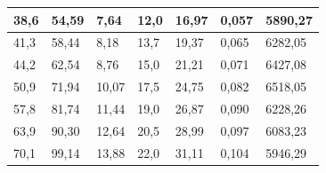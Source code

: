 \documentclass[a4paper,12pt]{article} %
\begin{document}
\begin{table}[h!]
\begin{tabular}{|l|l|l|l|l|l|l|}
		38,6                                      & 54,59                                                   & 7,64                                                  & 12,0                                     & 16,97                                                   & 0,057                        & 5890,27                                         \\ \hline
		41,3                                      & 58,44                                                   & 8,18                                                  & 13,7                                     & 19,37                                                   & 0,065                        & 6282,05                                         \\ \hline
		44,2                                      & 62,54                                                   & 8,76                                                  & 15,0                                     & 21,21                                                   & 0,071                        & 6427,08                                         \\ \hline
		50,9                                      & 71,94                                                   & 10,07                                                 & 17,5                                     & 24,75                                                   & 0,082                        & 6518,05                                         \\ \hline
		57,8                                      & 81,74                                                   & 11,44                                                 & 19,0                                     & 26,87                                                   & 0,090                         & 6228,26                                         \\ \hline
		63,9                                      & 90,30                                                   & 12,64                                                 & 20,5                                     & 28,99                                                   & 0,097                        & 6083,23                                         \\ \hline
		70,1                                      & 99,14                                                   & 13,88                                                 & 22,0                                     & 31,11                                                   & 0,104                        & 5946,29                                         \\ \hline

\end{tabular}
\end{table}
\end{document}
